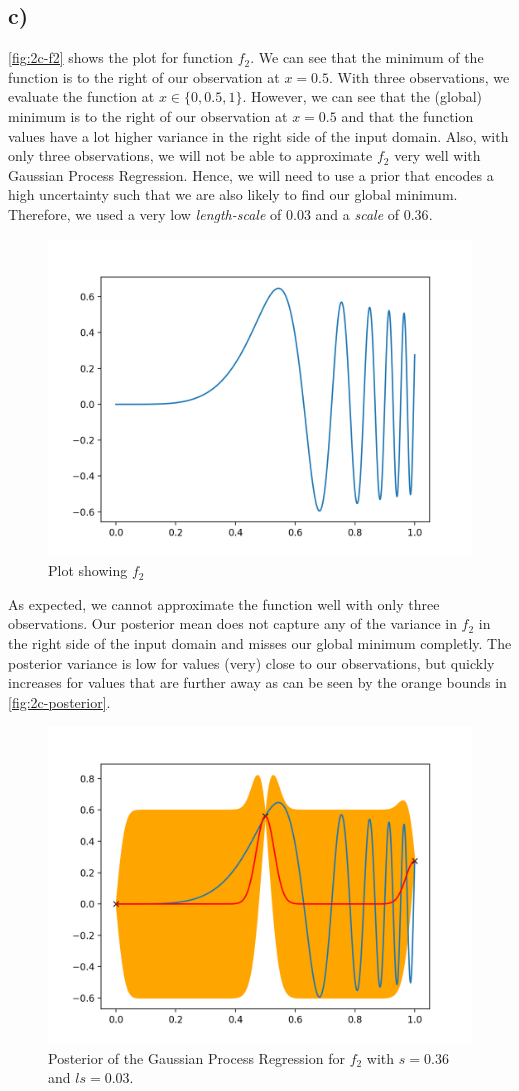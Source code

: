 \documentclass[11pt]{article}
\begin{document}
\subsection{c)}\label{subsec:gpr-c}

\autoref{fig:2c-f2} shows the plot for function $f_2$. We can see that the minimum of the function is to the right of our observation at $x=0.5$. With three observations, we evaluate the function at $x\in \{0, 0.5, 1\}$. However, we can see that the (global) minimum is to the right of our observation at $x=0.5$ and that the function values have a lot higher variance in the right side of the input domain. Also, with only three observations, we will not be able to approximate $f_2$ very well with Gaussian Process Regression. Hence, we will need to use a prior that encodes a high uncertainty such that we are also likely to find our global minimum. Therefore, we used a very low \textit{length-scale} of $0.03$ and a \textit{scale} of $0.36$. 

\begin{figure}[H]
  	\center
  	\includegraphics[width=.5\columnwidth]{assets/2c-f2}
  	\caption{Plot showing $f_2$}
  	\label{fig:2c-f2}
\end{figure}

\noindent As expected, we cannot approximate the function well with only three observations. Our posterior mean does not capture any of the variance in $f_2$ in the right side of the input domain and misses our global minimum completly. The posterior variance is low for values (very) close to our observations, but quickly increases for values that are further away as can be seen by the orange bounds in \autoref{fig:2c-posterior}. 

\begin{figure}[H]
  	\center
  	\includegraphics[width=.5\columnwidth]{assets/2c-posterior}
  	\caption{Posterior of the Gaussian Process Regression for $f_2$ with $s=0.36$ and $ls=0.03$.}
  	\label{fig:2c-posterior}
\end{figure}
\end{document}
